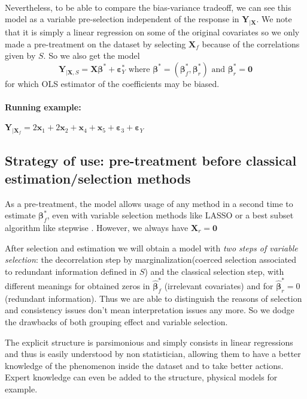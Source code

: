 \documentclass[11pt,a4paper]{article}
\begin{document}
\\
Nevertheless, to be able to compare the bias-variance tradeoff, we can see this model as a variable pre-selection independent of the response in $\boldsymbol{Y}_{|\boldsymbol{X}}$.
We note that it is simply a linear regression on some of the original covariates so we only made a pre-treatment on the dataset by selecting $\boldsymbol{X}_f$ because of the correlations given by $S$. So we also get the model
\begin{equation}
\boldsymbol{Y}_{|\boldsymbol{X},S}=\boldsymbol{X}\boldsymbol{\beta}^*+\boldsymbol{\varepsilon}_Y^* \textrm{ where }\boldsymbol{\beta}^*=(\boldsymbol{\beta}_f^*,\boldsymbol{\beta}_r^*) \textrm{ and } \boldsymbol{\beta}_r^*=\boldsymbol{0}
\end{equation}
	for which OLS estimator of the coefficients may be biased.  

\paragraph{Running example:} $\boldsymbol{Y}_{|\boldsymbol{X}_f}= 2\boldsymbol{x}_1+2\boldsymbol{x}_2+\boldsymbol{x}_4+\boldsymbol{x}_5+\boldsymbol{\varepsilon}_3 +\boldsymbol{\varepsilon}_Y$
\subsection{Strategy of use: pre-treatment before classical estimation/selection methods}\label{interpretation}

As a pre-treatment, the model allows usage of any method in a second time to estimate $\boldsymbol{\beta}_f^*$, even with variable selection methods like LASSO or a best subset algorithm like stepwise \cite{seber2012linear}. However, we always have $\boldsymbol{X}_r=\boldsymbol{0}$

After selection and estimation we will obtain a model with { \it two steps of variable selection}: the decorrelation step by marginalization(coerced selection associated to redundant information defined in $S$) and the classical selection step, with different meanings for obtained zeros in $\hat{\boldsymbol{\beta}}^*_f$ (irrelevant covariates) and for $\hat{\boldsymbol{\beta}}^*_r=0$ (redundant information). 
 Thus we are able to distinguish the reasons of selection and consistency issues don't mean interpretation issues any more. So we dodge the drawbacks of both grouping effect and variable selection.


The explicit structure is parsimonious and simply consists in linear regressions and thus is easily understood by non statistician, allowing them to have a better knowledge of the phenomenon inside the dataset and to take better actions. Expert knowledge can even be added to the structure, physical models for example.
\end{document}
